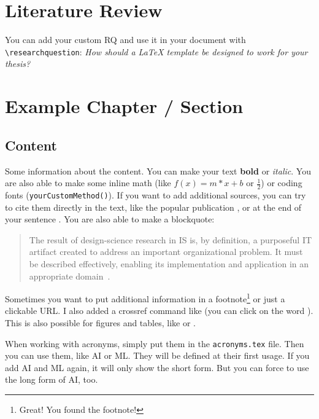 \documentclass[
	12pt,
	a4paper,
	american,
	oneside
	]{scrartcl}
\newcommand\researchquestion{How should a LaTeX template be designed to work for your thesis?}
\begin{document}
	
	\clearpage
	\FloatBarrier
	\section{Literature Review}\label{sec:literatureReview}
	
	You can add your custom \ac{RQ} and use it in your document with \texttt{\textbackslash researchquestion}: \emph{\researchquestion}
	
	
	\clearpage
	\FloatBarrier
	\section{Example Chapter / Section}\label{sec:anotherSection}
	
	\subsection{Content}
	Some information about the content. You can make your text \textbf{bold} or \emph{italic}. You are also able to make some inline math (like $f(x)=m*x+b$ or $\frac{1}{2}$) or coding fonts (\texttt{yourCustomMethod()}). If you want to add additional sources, you can try to cite them directly in the text, like the popular publication \citet{hawking.1973}, or at the end of your sentence \citep[p.~1]{hawking.1973}. You are also able to make a blockquote:
	\blockquote{\grqq The result of design-science research in \acs{IS} is, by definition, a purposeful IT artifact created to address an important organizational problem. It must be described effectively, enabling its implementation and application in an appropriate domain\grqq\ \citep[p.~82]{hevner.2004}.}
	
	Sometimes you want to put additional information in a footnote\footnote{Great! You found the footnote!} or just a clickable URL. I also added a crossref command like  (you can click on the word \grqq {}\grqq). This is also possible for figures and tables, like  or .
	
	When working with acronyms, simply put them in the \texttt{acronyms.tex} file. Then you can use them, like \ac{AI} or \ac{ML}. They will be defined at their first usage. If you add \ac{AI} and \ac{ML} again, it will only show the short form. But you can force to use the long form of \acl{AI}, too.
	
\end{document}
